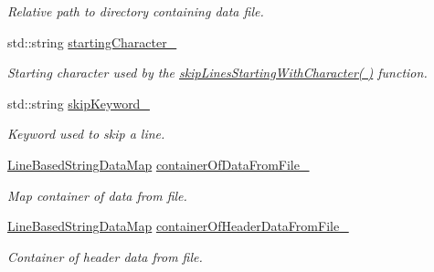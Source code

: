 \begin{DoxyCompactItemize}
\begin{DoxyCompactList}\small\item\em Relative path to directory containing data file. \end{DoxyCompactList}\item 
std\+::string \hyperlink{classtudat_1_1input__output_1_1TwoLineElementsTextFileReader_a5985ea4229410e047d3fb35539dd378a}{starting\+Character\+\_\+}\hypertarget{classtudat_1_1input__output_1_1TwoLineElementsTextFileReader_a5985ea4229410e047d3fb35539dd378a}{}\label{classtudat_1_1input__output_1_1TwoLineElementsTextFileReader_a5985ea4229410e047d3fb35539dd378a}

\begin{DoxyCompactList}\small\item\em Starting character used by the \hyperlink{classtudat_1_1input__output_1_1TwoLineElementsTextFileReader_ad9055afcba240a201cb2fd53b1d80fe9}{skip\+Lines\+Starting\+With\+Character( )} function. \end{DoxyCompactList}\item 
std\+::string \hyperlink{classtudat_1_1input__output_1_1TwoLineElementsTextFileReader_a252b67a144db5023148ec265162ab686}{skip\+Keyword\+\_\+}\hypertarget{classtudat_1_1input__output_1_1TwoLineElementsTextFileReader_a252b67a144db5023148ec265162ab686}{}\label{classtudat_1_1input__output_1_1TwoLineElementsTextFileReader_a252b67a144db5023148ec265162ab686}

\begin{DoxyCompactList}\small\item\em Keyword used to skip a line. \end{DoxyCompactList}\item 
\hyperlink{classtudat_1_1input__output_1_1TwoLineElementsTextFileReader_ae6d9157e1d7836a8134b99a19585c8bd}{Line\+Based\+String\+Data\+Map} \hyperlink{classtudat_1_1input__output_1_1TwoLineElementsTextFileReader_a1c6c0f8b0d5129531660e25722b86572}{container\+Of\+Data\+From\+File\+\_\+}
\begin{DoxyCompactList}\small\item\em Map container of data from file. \end{DoxyCompactList}\item 
\hyperlink{classtudat_1_1input__output_1_1TwoLineElementsTextFileReader_ae6d9157e1d7836a8134b99a19585c8bd}{Line\+Based\+String\+Data\+Map} \hyperlink{classtudat_1_1input__output_1_1TwoLineElementsTextFileReader_aaadd05e1ca6685848534e1d6f4b4292d}{container\+Of\+Header\+Data\+From\+File\+\_\+}
\begin{DoxyCompactList}\small\item\em Container of header data from file. \end{DoxyCompactList}\end{DoxyCompactItemize}


